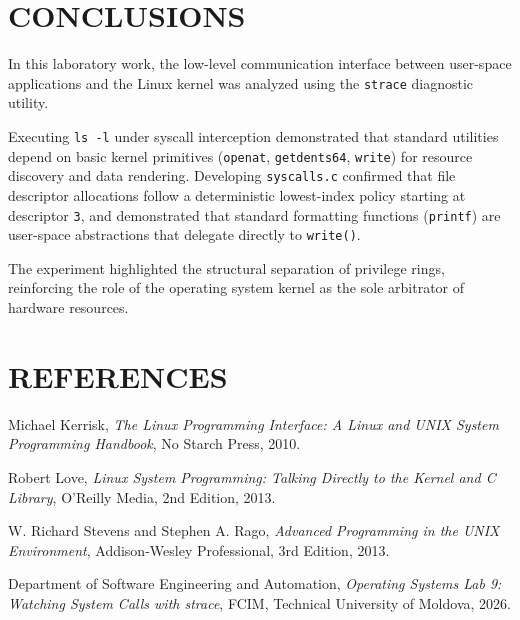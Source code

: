 \documentclass[12pt,a4paper]{report}
\numberwithin{equation}{chapter}
\numberwithin{figure}{chapter}
\numberwithin{table}{chapter}
\begin{document}
\chapter{CONCLUSIONS}
In this laboratory work, the low-level communication interface between user-space applications and the Linux kernel was analyzed using the \texttt{strace} diagnostic utility.

Executing \texttt{ls -l} under syscall interception demonstrated that standard utilities depend on basic kernel primitives (\texttt{openat}, \texttt{getdents64}, \texttt{write}) for resource discovery and data rendering. Developing \texttt{syscalls.c} confirmed that file descriptor allocations follow a deterministic lowest-index policy starting at descriptor \texttt{3}, and demonstrated that standard formatting functions (\texttt{printf}) are user-space abstractions that delegate directly to \texttt{write()}. 

The experiment highlighted the structural separation of privilege rings, reinforcing the role of the operating system kernel as the sole arbitrator of hardware resources.

\chapter*{REFERENCES}

\noindent [1] Michael Kerrisk, \textit{The Linux Programming Interface: A Linux and UNIX System Programming Handbook}, No Starch Press, 2010.

\noindent [2] Robert Love, \textit{Linux System Programming: Talking Directly to the Kernel and C Library}, O'Reilly Media, 2nd Edition, 2013.

\noindent [3] W. Richard Stevens and Stephen A. Rago, \textit{Advanced Programming in the UNIX Environment}, Addison-Wesley Professional, 3rd Edition, 2013.

\noindent [4] Department of Software Engineering and Automation, \textit{Operating Systems Lab 9: Watching System Calls with strace}, FCIM, Technical University of Moldova, 2026.
\end{document}
